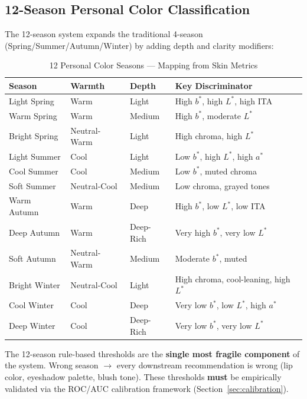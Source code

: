 \documentclass[12pt,a4paper]{article}
\begin{document}
\subsection{12-Season Personal Color Classification}

The 12-season system expands the traditional 4-season (Spring/Summer/Autumn/Winter) by adding depth and clarity modifiers:

\begin{table}[H]
\centering
\caption{12 Personal Color Seasons --- Mapping from Skin Metrics}
\begin{tabular}{@{}l l l l@{}}
\toprule
\textbf{Season} & \textbf{Warmth} & \textbf{Depth} & \textbf{Key Discriminator} \\
\midrule
Light Spring & Warm & Light & High $b^*$, high $L^*$, high ITA\textdegree{} \\
Warm Spring & Warm & Medium & High $b^*$, moderate $L^*$ \\
Bright Spring & Neutral-Warm & Light & High chroma, high $L^*$ \\
Light Summer & Cool & Light & Low $b^*$, high $L^*$, high $a^*$ \\
Cool Summer & Cool & Medium & Low $b^*$, muted chroma \\
Soft Summer & Neutral-Cool & Medium & Low chroma, grayed tones \\
Warm Autumn & Warm & Deep & High $b^*$, low $L^*$, low ITA\textdegree{} \\
Deep Autumn & Warm & Deep-Rich & Very high $b^*$, very low $L^*$ \\
Soft Autumn & Neutral-Warm & Medium & Moderate $b^*$, muted \\
Bright Winter & Neutral-Cool & Light & High chroma, cool-leaning, high $L^*$ \\
Cool Winter & Cool & Deep & Very low $b^*$, low $L^*$, high $a^*$ \\
Deep Winter & Cool & Deep-Rich & Very low $b^*$, very low $L^*$ \\
\bottomrule
\end{tabular}
\end{table}

\begin{warnblock}
The 12-season rule-based thresholds are the \textbf{single most fragile component} of the system. Wrong season $\to$ every downstream recommendation is wrong (lip color, eyeshadow palette, blush tone). These thresholds \textbf{must} be empirically validated via the ROC/AUC calibration framework (Section~\ref{sec:calibration}).
\end{warnblock}
\end{document}
